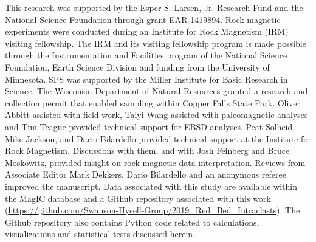\documentclass[draft]{agujournal2019}
\begin{document}
%
%
%
%
%
%
%
%


\acknowledgments
This research was supported by the Esper S. Larsen, Jr. Research Fund and the National Science Foundation through grant EAR-1419894. Rock magnetic experiments were conducted during an Institute for Rock Magnetism (IRM) visiting fellowship. The IRM and its visiting fellowship program is made possible through the Instrumentation and Facilities program of the National Science Foundation, Earth Science Division and funding from the University of Minnesota. SPS was supported by the Miller Institute for Basic Research in Science. The Wisconsin Department of Natural Resources granted a research and collection permit that enabled sampling within Copper Falls State Park. Oliver Abbitt assisted with field work, Taiyi Wang assisted with paleomagnetic analyses and Tim Teague provided technical support for EBSD analyses. Peat Solheid, Mike Jackson, and Dario Bilardello provided technical support at the Institute for Rock Magnetism. Discussions with them, and with Josh Feinberg and Bruce Moskowitz, provided insight on rock magnetic data interpretation. Reviews from Associate Editor Mark Dekkers, Dario Bilardello and an anonymous referee improved the manuscript. Data associated with this study are available within the MagIC database and a Github repository associated with this work (\url{https://github.com/Swanson-Hysell-Group/2019_Red_Bed_Intraclasts}). The Github repository also contains Python code related to calculations, visualizations and statistical tests discussed herein.  



%
%
%
\end{document}
